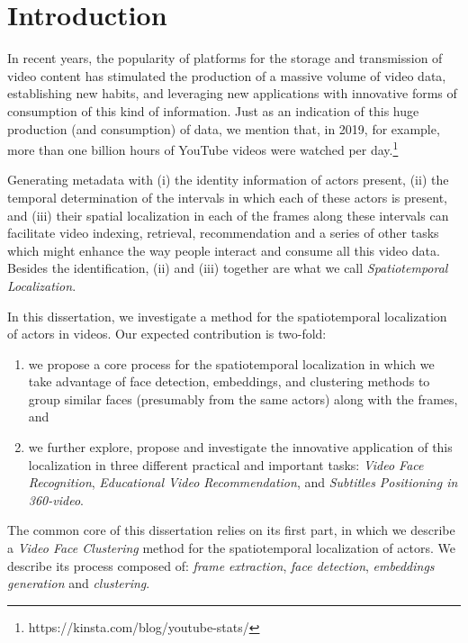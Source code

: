 \newpage

\chapter{Introduction}
\label{chap:introduction}

In recent years, the popularity of platforms for the storage and transmission of video content has stimulated the production of a massive volume of video data, establishing new habits, and leveraging new applications with innovative forms of consumption of this kind of information. Just as an indication of this huge production (and consumption) of data, we mention that, in 2019, for example, more than one billion hours of YouTube videos were watched per day.\footnote{https://kinsta.com/blog/youtube-stats/}


Generating metadata with (i) the identity information of actors present, (ii) the temporal determination of the intervals in which each of these actors is present, and (iii) their spatial localization in each of the frames along these intervals can facilitate video indexing, retrieval, recommendation and a series of other tasks which might enhance the way people interact and consume all this video data. Besides the identification, (ii) and (iii) together are what we call \textit{Spatiotemporal Localization}. 

In this dissertation, we investigate a method for the spatiotemporal localization of actors in videos. Our expected contribution is two-fold: 
\begin{enumerate}
\item we propose a core process for the spatiotemporal localization in which we take advantage of face detection, embeddings, and clustering methods to group similar faces (presumably from the same actors) along with the frames, and \item we further explore, propose and investigate the innovative application of this localization in three different practical and important tasks: \emph{Video Face Recognition}, \emph{Educational Video Recommendation}, and \emph{Subtitles Positioning in 360-video}.  
\end{enumerate}

The common core of this dissertation relies on its first part, in which we describe a \textit{Video Face Clustering} method for the spatiotemporal localization of actors. We describe its process composed of: \textit{frame extraction}, \textit{face detection}, \textit{embeddings generation} and \textit{clustering}. 

